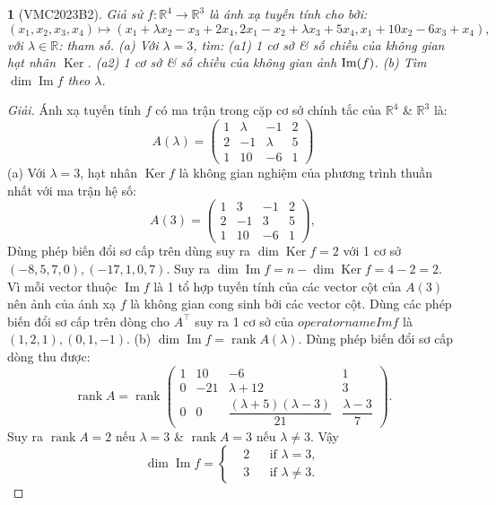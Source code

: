 \documentclass{article}
\newtheorem{baitoan}{}
\begin{document}
\begin{baitoan}[VMC2023B2]
	Giả sử $f:\mathbb{R}^4\to\mathbb{R}^3$ là ánh xạ tuyến tính cho bởi:
	\begin{equation*}
		(x_1,x_2,x_3,x_4)\mapsto(x_1 + \lambda x_2 - x_3 + 2x_4,2x_1 - x_2 + \lambda x_3 + 5x_4,x_1 + 10x_2 - 6x_3 + x_4),
	\end{equation*}
	với $\lambda\in\mathbb{R}$: tham số. (a) Với $\lambda = 3$, tìm: (a1) 1 cơ sở \& số chiều của không gian hạt nhân $\operatorname{Ker}$. (a2) 1 cơ sở \& số chiều của không gian ảnh ${\rm Im}(f)$. (b) Tìm $\dim\operatorname{Im}f$ theo $\lambda$.
\end{baitoan}

\begin{proof}[Giải]
	Ánh xạ tuyến tính $f$ có ma trận trong cặp cơ sở chính tắc của $\mathbb{R}^4$ \& $\mathbb{R}^3$ là:
	\begin{equation*}
		A(\lambda) = \begin{pmatrix}
			1 & \lambda & -1 & 2\\2 & -1 & \lambda & 5\\1 & 10 & -6 & 1
		\end{pmatrix}
	\end{equation*}
	(a) Với $\lambda = 3$, hạt nhân $\operatorname{Ker}f$ là không gian nghiệm của phương trình thuần nhất với ma trận hệ số:
	\begin{equation*}
		A(3) = \begin{pmatrix}
			1 & 3 & -1 & 2\\2 & -1 & 3 & 5\\1 & 10 & -6 & 1
		\end{pmatrix},
	\end{equation*}
	Dùng phép biến đổi sơ cấp trên dùng suy ra $\dim\operatorname{Ker}f = 2$ với 1 cơ sở $(-8,5,7,0),(-17,1,0,7)$. Suy ra $\dim\operatorname{Im}f = n - \dim\operatorname{Ker}f = 4 - 2 = 2$. Vì mỗi vector thuộc $\operatorname{Im}f$ là 1 tổ hợp tuyến tính của các vector cột của $A(3)$ nên ảnh của ánh xạ $f$ là không gian cong sinh bởi các vector cột. Dùng các phép biến đổi sơ cấp trên dòng cho $A^\top$ suy ra 1 cơ sở của $operatorname{Im}f$ là $(1,2,1),(0,1,-1)$. (b) $ \dim\operatorname{Im}f = \operatorname{rank}A(\lambda)$. Dùng phép biến đổi sơ cấp dòng thu được:
	\begin{equation*}
		\operatorname{rank}A = \operatorname{rank}\begin{pmatrix}
			1 & 10 & -6 & 1\\0 & -21 & \lambda + 12 & 3\\0 & 0 & \dfrac{(\lambda + 5)(\lambda - 3)}{21} & \dfrac{\lambda - 3}{7}
		\end{pmatrix}.
	\end{equation*}
	Suy ra $\operatorname{rank}A = 2$ nếu $\lambda = 3$ \& $\operatorname{rank}A = 3$ nếu $\lambda\ne3$. Vậy
	\begin{equation*}
		\dim\operatorname{Im}f = \left\{\begin{split}
			&2&&\mbox{if }\lambda = 3,\\
			&3&&\mbox{if }\lambda\ne3.
		\end{split}\right.
	\end{equation*}
\end{proof}
\end{document}
